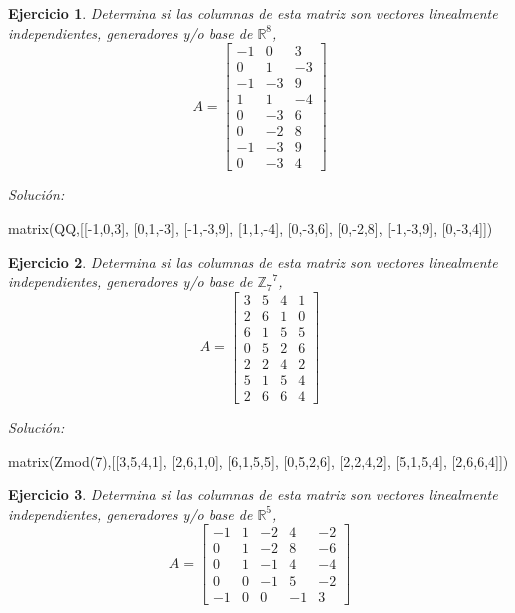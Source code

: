 \documentclass{amsart}
\newtheorem{ejer}{Ejercicio}
\begin{document}


\begin{ejer} Determina si las columnas de esta matriz son vectores linealmente independientes, generadores y/o base de ${{\mathbb R}}^{8}$,
\[ A = \left[\begin{array}{rrr}
-1 & 0 & 3 \\
0 & 1 & -3 \\
-1 & -3 & 9 \\
1 & 1 & -4 \\
0 & -3 & 6 \\
0 & -2 & 8 \\
-1 & -3 & 9 \\
0 & -3 & 4
\end{array}\right] \]
\end{ejer}

{\it Soluci\'on:}

\begin{sageblock}
matrix(QQ,[[-1,0,3],
[0,1,-3],
[-1,-3,9],
[1,1,-4],
[0,-3,6],
[0,-2,8],
[-1,-3,9],
[0,-3,4]])
\end{sageblock}



\begin{ejer} Determina si las columnas de esta matriz son vectores linealmente independientes, generadores y/o base de ${{\mathbb Z}_{7}}^{7}$,
\[ A = \left[\begin{array}{rrrr}
3 & 5 & 4 & 1 \\
2 & 6 & 1 & 0 \\
6 & 1 & 5 & 5 \\
0 & 5 & 2 & 6 \\
2 & 2 & 4 & 2 \\
5 & 1 & 5 & 4 \\
2 & 6 & 6 & 4
\end{array}\right] \]
\end{ejer}

{\it Soluci\'on:}

\begin{sageblock}
matrix(Zmod(7),[[3,5,4,1],
[2,6,1,0],
[6,1,5,5],
[0,5,2,6],
[2,2,4,2],
[5,1,5,4],
[2,6,6,4]])
\end{sageblock}



\begin{ejer} Determina si las columnas de esta matriz son vectores linealmente independientes, generadores y/o base de ${{\mathbb R}}^{5}$,
\[ A = \left[\begin{array}{rrrrr}
-1 & 1 & -2 & 4 & -2 \\
0 & 1 & -2 & 8 & -6 \\
0 & 1 & -1 & 4 & -4 \\
0 & 0 & -1 & 5 & -2 \\
-1 & 0 & 0 & -1 & 3
\end{array}\right] \]
\end{ejer}
\end{document}
